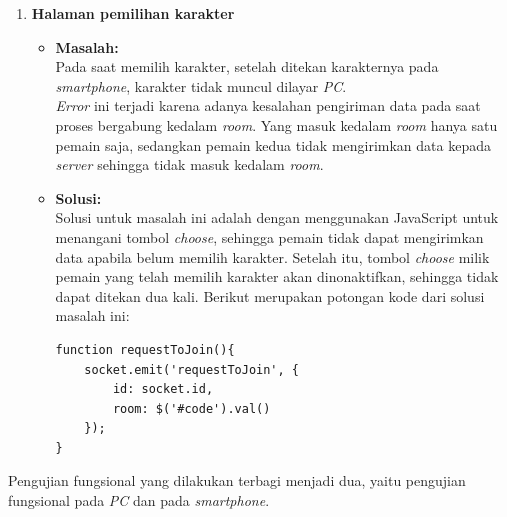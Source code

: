 \begin{enumerate}
	\item \textbf{Halaman pemilihan karakter}
	\begin{itemize}
		\item \textbf{Masalah:} \\
		Pada saat memilih karakter, setelah ditekan karakternya pada \textit{smartphone}, karakter tidak muncul dilayar \textit{PC}.\\
		
		\textit{Error} ini terjadi karena adanya kesalahan pengiriman data pada saat proses bergabung kedalam \textit{room}. Yang masuk kedalam \textit{room} hanya satu pemain saja, sedangkan pemain kedua tidak mengirimkan data kepada \textit{server} sehingga tidak masuk kedalam \textit{room}.
		
		\item \textbf{Solusi:} \\
		Solusi untuk masalah ini adalah dengan menggunakan JavaScript untuk menangani tombol \textit{choose}, sehingga pemain tidak dapat mengirimkan data apabila belum memilih karakter. Setelah itu, tombol \textit{choose}  milik pemain yang telah memilih karakter akan dinonaktifkan, sehingga tidak dapat ditekan dua kali. Berikut merupakan potongan kode dari solusi masalah ini:
		
\begin{lstlisting}[caption={Proses menangani tombol \textit{choose}}, label={lst:tombolChoose2},captionpos=b]
function requestToJoin(){
	socket.emit('requestToJoin', {
		id: socket.id,
		room: $('#code').val()
	});
}
\end{lstlisting}
	\end{itemize}
\end{enumerate}

Pengujian fungsional yang dilakukan terbagi menjadi dua, yaitu pengujian fungsional pada \textit{PC} dan pada \textit{smartphone}.

